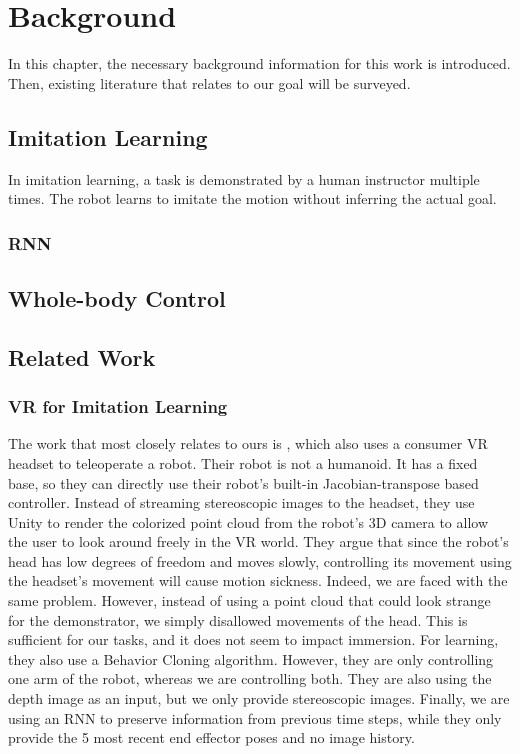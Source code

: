 \chapter{Background}

In this chapter, the necessary background information for this work is introduced. Then, existing literature that relates to our goal will be surveyed.

\section{Imitation Learning}

In imitation learning, a task is demonstrated by a human instructor multiple times. The robot learns to imitate the motion without inferring the actual goal.
\subsection{RNN}

\section{Whole-body Control}

\section{Related Work}

\subsection{VR for Imitation Learning}

The work that most closely relates to ours is \cite{zhang2018deep}, which also uses a consumer VR headset to teleoperate a robot. 
Their robot is not a humanoid. 
It has a fixed base, so they can directly use their robot's built-in Jacobian-transpose based controller. 
Instead of streaming stereoscopic images to the headset, they use Unity to render the colorized point cloud from the robot's 3D camera to allow the user to look around freely in the VR world. 
They argue that since the robot's head has low degrees of freedom and moves slowly, controlling its movement using the headset's movement will cause motion sickness. 
Indeed, we are faced with the same problem. 
However, instead of using a point cloud that could look strange for the demonstrator, we simply disallowed movements of the head.
This is sufficient for our tasks, and it does not seem to impact immersion. 
For learning, they also use a Behavior Cloning algorithm. 
However, they are only controlling one arm of the robot, whereas we are controlling both. 
They are also using the depth image as an input, but we only provide stereoscopic images. 
Finally, we are using an RNN to preserve information from previous time steps, while they only provide the 5 most recent end effector poses and no image history. 

